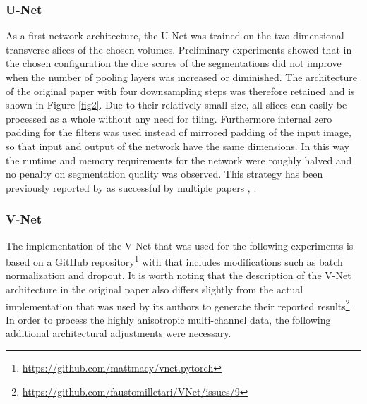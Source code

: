 \documentclass[10pt,letterpaper]{article}
\begin{document}
	\subsubsection*{U-Net}
	As a first network architecture, the U-Net \cite{ronneberger2015u} was trained on the two-dimensional transverse slices of the chosen volumes. Preliminary experiments showed that in the chosen configuration the dice scores of the segmentations did not improve when the number of pooling layers was increased or diminished. The architecture of the original paper with four downsampling steps was therefore retained and is shown in Figure \ref{fig2}.
	Due to their relatively small size, all slices can easily be processed as a whole without any need for tiling. Furthermore internal zero padding for the filters was used instead of mirrored padding of the input image, so that input and output of the network have the same dimensions. In this way the runtime and memory requirements for the network were roughly halved and no penalty on segmentation quality was observed. This strategy has been previously reported by as successful by multiple papers \cite{dong2017automatic}, \cite{kayalibay2017cnn}.



	\subsubsection*{V-Net}
	The implementation of the V-Net \cite{milletari2016v} that was used for the following experiments is based on a GitHub repository\footnote{\url{https://github.com/mattmacy/vnet.pytorch}} with that includes modifications such as batch normalization and dropout. It is worth noting that the description of the V-Net architecture in the original paper also differs slightly from the actual implementation that was used by its authors to generate their reported results\footnote{\url{https://github.com/faustomilletari/VNet/issues/9}}. In order to process the highly anisotropic multi-channel data, the following additional architectural adjustments were necessary.
\end{document}
